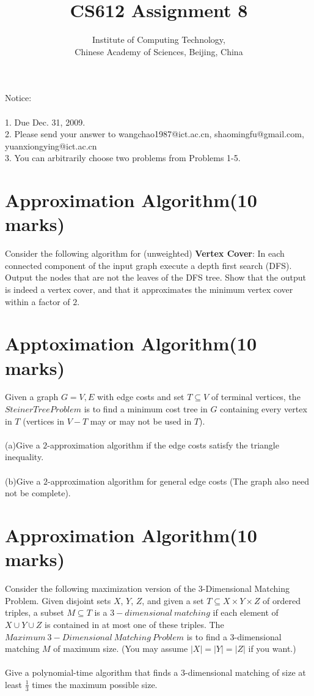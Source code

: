 \documentclass[a4paper,11pt]{article}
\title{CS612 Assignment 8}
\author{Institute of Computing Technology, \\
                       Chinese Academy of Sciences, Beijing, China }
\begin{document}
\maketitle

Notice:\\\\
1. Due Dec. 31, 2009.\\
2. Please send your answer to wangchao1987@ict.ac.cn, shaomingfu@gmail.com, yuanxiongying@ict.ac.cn\\
3. You can arbitrarily choose two problems from Problems 1-5.

\section{Approximation Algorithm(10 marks)}

Consider the following algorithm for (unweighted) {\bf Vertex Cover}: In each connected component of the input graph execute a depth first search (DFS). Output the nodes that are not the leaves of the DFS tree. Show that the output is indeed a vertex cover, and that it approximates the minimum vertex cover within a factor of $2$.

\section{Apptoximation Algorithm(10 marks)}

Given a graph $G={V,E}$ with edge costs and set $T\subseteq V$ of terminal vertices, the $Steiner Tree Problem$ is to find a minimum cost tree in $G$ containing every vertex in $T$ (vertices in $V-T$ may or may not be used in $T$).\\\\
				 (a)Give a $2$-approximation algorithm if the edge costs satisfy the triangle inequality.\\\\
				 (b)Give a $2$-approximation algorithm for general edge costs (The graph also need not be complete).

\section{Approximation Algorithm(10 marks)}

Consider the following maximization version of the 3-Dimensional Matching Problem. Given disjoint sets $X$, $Y$, $Z$, and given a set $T\subseteq X\times Y\times Z$ of ordered triples, a subset $M\subseteq T$ is a $3-dimensional\ matching$ if each element of $X\cup Y\cup Z$ is contained in at most one of these triples. The $Maximum\ 3-Dimensional\ Matching\ Problem$ is to find a 3-dimensional matching $M$ of maximum size. (You may assume $|X|=|Y|=|Z|$ if you want.)\\\\
Give a polynomial-time algorithm that finds a 3-dimensional matching of size at least $ \frac{1}{3} $ times the maximum possible size.
\end{document}
